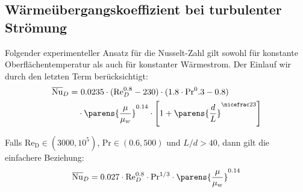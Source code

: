 	\subsection{Wärmeübergangskoeffizient bei turbulenter Strömung} %
		Folgender experimenteller Ansatz für die Nusselt-Zahl gilt sowohl für konstante Oberflächentemperatur als auch für konstanter Wärmestrom. Der Einlauf wir durch den letzten Term berücksichtigt:
		\begin{align*}
			\overline{\mathrm{Nu}}_D =&\ 0.0235 \cdot ( \mathrm{Re}_D^{0.8} - 230 ) \cdot ( 1.8 \cdot \mathrm{Pr}^0.3 - 0.8 ) \\
			& \cdot \parens{\frac{\mu}{\mu_w}}^{0.14} \cdot \left[
				1 + \parens{\frac d L}^{\nicefrac 2 3}
			\right]
		\end{align*}

		Falls $\mathrm{Re_D} \in (3000,10^5)$, $\mathrm{Pr} \in (0.6, 500)$ und $L/d > 40$, dann gilt die einfachere Beziehung:
		\[
			\overline{\mathrm{Nu}}_D = 0.027 \cdot \mathrm{Re}_D^{0.8} \cdot \mathrm{Pr}^{1/3} \cdot \parens{\frac{\mu}{\mu_w}}^{0.14}
		\]
